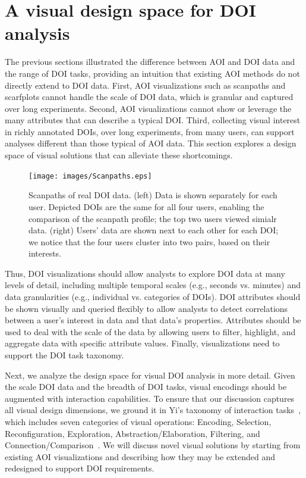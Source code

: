 \section{A visual design space for DOI analysis}

The previous sections illustrated the difference between AOI and DOI data and the range of DOI tasks, providing an intuition that existing AOI methods do not directly extend to DOI data. First, AOI visualizations such as scanpaths and scarfplots cannot handle the scale of DOI data, which is granular and captured over long experiments. Second, AOI visualizations cannot show or leverage the many attributes that can describe a typical DOI.  Third, collecting visual interest in richly annotated DOIs, over long experiments, from many users, can support analyses different than those typical of AOI data. This section explores a design space of visual solutions that can alleviate these shortcomings.

\begin{figure}[!htb]
  \centering
  \texttt{[image: images/Scanpaths.eps]}
  \caption{Scanpaths of real DOI data. (left) Data is shown separately for each user. Depicted DOIs are the same for all four users, enabling the comparison of the scanpath profile; the top two users viewed simialr data. (right) Users' data are shown next to each other for each DOI; we notice that the four users cluster into two pairs, based on their interests.}
	\label{fig:scanpath}
\end{figure}

Thus, DOI visualizations should allow analysts to explore DOI data at many levels of detail, including multiple temporal scales (e.g., seconds vs. minutes) and data granularities (e.g., individual vs. categories of DOIs).  DOI attributes should be shown visually and queried flexibly to allow analysts to detect correlations between a user's interest in data and that data's properties. Attributes should be used to deal with the scale of the data by allowing users to filter, highlight, and aggregate data with specific attribute values. Finally, visualizations need to support the DOI task taxonomy. 

Next, we analyze the design space for visual DOI analysis in more detail. Given the scale DOI data and the breadth of DOI tasks, visual encodings should be augmented with interaction capabilities. To ensure that our discussion captures all visual design dimensions, we ground it in Yi's taxonomy of interaction tasks~\cite{yi2007toward}, which includes seven categories of visual operations: Encoding, Selection, Reconfiguration, Exploration, Abstraction/Elaboration, Filtering, and Connection/Comparison~\cite{yi2007toward}. We will discuss novel visual solutions by starting from existing AOI visualizations and describing how they may be extended and redesigned to support DOI requirements. 


